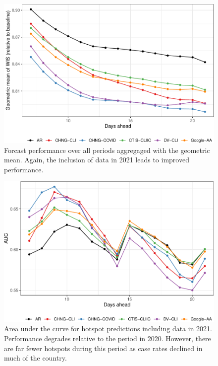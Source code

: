 \clearpage

\begin{figure}

{\centering \includegraphics[width=\textwidth]{fig/fcast-alldates-adjusted-1} 

}

\caption{Forcast performance over all periods aggregaged with the geometric mean. Again, the inclusion of data in 2021 leads to improved performance.}\label{fig:fcast-alldates-adjusted}
\end{figure}

\clearpage

\begin{figure}

{\centering \includegraphics[width=\textwidth]{fig/hot-alldates-1} 

}

\caption{Area under the curve for hotspot predictions including data in 2021. Performance degrades relative to the period in 2020. However, there are far fewer hotspots during this period as case rates declined in much of the country.}\label{fig:hot-alldates}
\end{figure}



%

